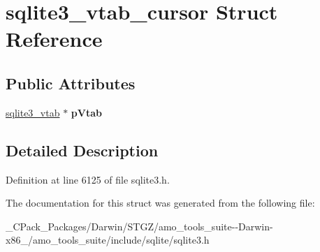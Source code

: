 \hypertarget{structsqlite3__vtab__cursor}{}\section{sqlite3\+\_\+vtab\+\_\+cursor Struct Reference}
\label{structsqlite3__vtab__cursor}
\subsection*{Public Attributes}
\begin{DoxyCompactItemize}
\item 
\mbox{\label{structsqlite3__vtab__cursor_a7bb57f3f9c7c618a9d6d33c6d9820bdc}} 
\hyperlink{structsqlite3__vtab}{sqlite3\+\_\+vtab} $\ast$ {\bfseries p\+Vtab}
\end{DoxyCompactItemize}


\subsection{Detailed Description}


Definition at line 6125 of file sqlite3.\+h.



The documentation for this struct was generated from the following file\+:\begin{DoxyCompactItemize}
\item 
\+\_\+\+C\+Pack\+\_\+\+Packages/\+Darwin/\+S\+T\+G\+Z/amo\+\_\+tools\+\_\+suite-\/-\/\+Darwin-\/x86\+\_/amo\+\_\+tools\+\_\+suite/include/sqlite/sqlite3.\+h\end{DoxyCompactItemize}
